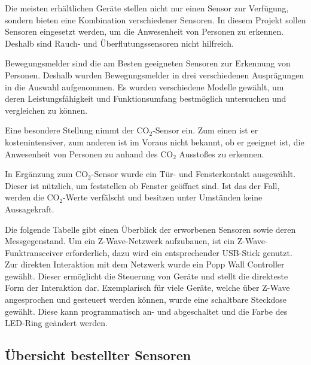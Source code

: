 Die meisten erhältlichen Geräte stellen nicht nur einen Sensor zur Verfügung, sondern bieten eine Kombination verschiedener Sensoren. In diesem Projekt sollen Sensoren eingesetzt werden, um die Anwesenheit von Personen zu erkennen. Deshalb sind Rauch- und Überflutungssensoren nicht hilfreich.

Bewegungsmelder sind die am Besten geeigneten Sensoren zur Erkennung von Personen. Deshalb wurden Bewegungsmelder in drei verschiedenen Ausprägungen in die Auswahl aufgenommen. Es wurden verschiedene Modelle gewählt, um deren Leistungsfähigkeit und Funktionsumfang bestmöglich untersuchen und vergleichen zu können.

Eine besondere Stellung nimmt der CO$_2$-Sensor ein. Zum einen ist er kostenintensiver, zum anderen ist im Voraus nicht bekannt, ob er geeignet ist, die Anwesenheit von Personen zu anhand des CO$_2$ Ausstoßes zu erkennen.

In Ergänzung zum CO$_2$-Sensor wurde ein Tür- und Fensterkontakt ausgewählt. Dieser ist nützlich, um feststellen ob Fenster geöffnet sind. Ist das der Fall, werden die CO$_2$-Werte verfälscht und besitzen unter Umständen keine Aussagekraft.

Die folgende Tabelle gibt einen Überblick der erworbenen Sensoren sowie deren  Messgegenstand. Um ein Z-Wave-Netzwerk aufzubauen, ist ein Z-Wave-Funktransceiver erforderlich, dazu wird ein entsprechender USB-Stick genutzt. Zur direkten Interaktion mit dem Netzwerk wurde ein Popp Wall Controller gewählt. Dieser ermöglicht die Steuerung von Geräte und stellt die direkteste Form der Interaktion dar. Exemplarisch für viele Geräte, welche über Z-Wave angesprochen und gesteuert werden können, wurde eine schaltbare Steckdose gewählt. Diese kann programmatisch an- und abgeschaltet und die Farbe des LED-Ring geändert werden.

\subsection{Übersicht bestellter Sensoren}

